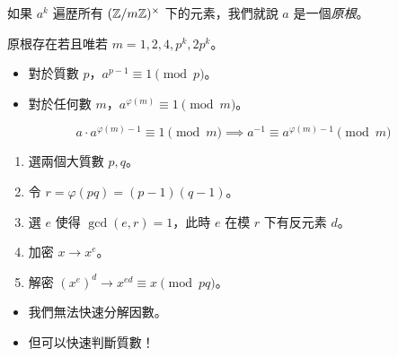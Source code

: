 \documentclass[standalone]{beamer}
\begin{document}
\begin{frame}

  \begin{definition}[原根]
    如果 $a^k$ 遍歴所有 $(\mathbb{Z} / m \mathbb{Z})^\times$ 下的元素，我們就說 $a$ 是一個\emph{原根}。
  \end{definition}
  \pause

  \begin{theorem}[原根存在的條件]
    原根存在若且唯若 $m = 1, 2, 4, p^k, 2p^k$。
  \end{theorem}
  \pause
\end{frame}

\begin{frame}
  \begin{theorem}[Euler 定理]
    \begin{itemize}
      \item 對於質數 $p$，$a^{p-1} \equiv 1 \pmod{p}$。
      \item 對於任何數 $m$，$a^{\varphi(m)} \equiv 1 \pmod{m}$。
    \end{itemize}
  \end{theorem}
  \pause \disskip

  \[ a \cdot a^{\varphi(m) - 1} \equiv 1 \pmod{m} \implies a^{-1} \equiv a^{\varphi(m) - 1} \pmod{m} \]
\end{frame}

\begin{frame}{}
  \begin{enumerate}[<+->]
    \item \alert<7>{選兩個大質數 $p, q$}。
    \item \alert<6>{令 $r = \varphi(pq) = (p-1)(q-1)$}。
    \item 選 $e$ 使得 $\gcd(e, r) = 1$，此時 $e$ 在模 $r$ 下有反元素 $d$。
    \item 加密 $x \to x^e$。
    \item 解密 $(x^e)^d \to x^{ed} \equiv x \pmod{pq}$。
  \end{enumerate}

  \begin{itemize}[<+->]
    \item 我們無法快速分解因數。
    \item 但可以快速判斷質數！
  \end{itemize}
\end{frame}
\end{document}

